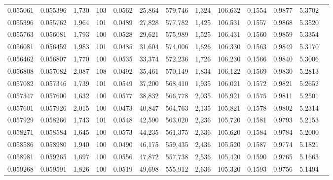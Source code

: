 \begin{tabular}{rrrrrrrrrrrrr}
0.055061 & 0.055396 & 1,730 & 103 &                                     0.0562 &  25,864 & 579,746 &   1,324 & 106,632 & 0.1554 & 0.9877 & 5.3702 \\
0.055396 & 0.055762 & 1,964 & 101 &                                     0.0489 &  27,828 & 577,782 &   1,425 & 106,531 & 0.1557 & 0.9868 & 5.3520 \\
0.055763 & 0.056081 & 1,793 & 100 &                                     0.0528 &  29,621 & 575,989 &   1,525 & 106,431 & 0.1560 & 0.9859 & 5.3354 \\
0.056081 & 0.056459 & 1,983 & 101 &                                     0.0485 &  31,604 & 574,006 &   1,626 & 106,330 & 0.1563 & 0.9849 & 5.3170 \\
0.056462 & 0.056807 & 1,770 & 100 &                                     0.0535 &  33,374 & 572,236 &   1,726 & 106,230 & 0.1566 & 0.9840 & 5.3006 \\
0.056808 & 0.057082 & 2,087 & 108 &                                     0.0492 &  35,461 & 570,149 &   1,834 & 106,122 & 0.1569 & 0.9830 & 5.2813 \\
0.057082 & 0.057346 & 1,739 & 101 &                                     0.0549 &  37,200 & 568,410 &   1,935 & 106,021 & 0.1572 & 0.9821 & 5.2652 \\
0.057347 & 0.057600 & 1,632 & 100 &                                     0.0577 &  38,832 & 566,778 &   2,035 & 105,921 & 0.1575 & 0.9811 & 5.2501 \\
0.057601 & 0.057926 & 2,015 & 100 &                                     0.0473 &  40,847 & 564,763 &   2,135 & 105,821 & 0.1578 & 0.9802 & 5.2314 \\
0.057929 & 0.058266 & 1,743 & 101 &                                     0.0548 &  42,590 & 563,020 &   2,236 & 105,720 & 0.1581 & 0.9793 & 5.2153 \\
0.058271 & 0.058584 & 1,645 & 100 &                                     0.0573 &  44,235 & 561,375 &   2,336 & 105,620 & 0.1584 & 0.9784 & 5.2000 \\
0.058586 & 0.058980 & 1,940 & 100 &                                     0.0490 &  46,175 & 559,435 &   2,436 & 105,520 & 0.1587 & 0.9774 & 5.1821 \\
0.058981 & 0.059265 & 1,697 & 100 &                                     0.0556 &  47,872 & 557,738 &   2,536 & 105,420 & 0.1590 & 0.9765 & 5.1663 \\
0.059268 & 0.059591 & 1,826 & 100 &                                     0.0519 &  49,698 & 555,912 &   2,636 & 105,320 & 0.1593 & 0.9756 & 5.1494 \\

\end{tabular}
